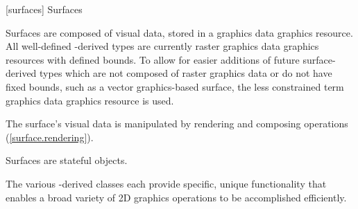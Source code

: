 
 [surfaces] {Surfaces}

\pnum
Surfaces are composed of visual data, stored in a graphics data graphics resource.
\enternote
All well-defined -derived types are currently raster graphics data graphics resources with defined bounds. To allow for easier additions of future surface-derived types which are not composed of raster graphics data or do not have fixed bounds, such as a vector graphics-based surface, the less constrained term graphics data graphics resource is used.
\exitnote

\pnum
The surface's visual data is manipulated by rendering and composing operations (\ref{surface.rendering}).

\pnum
Surfaces are stateful objects.

\pnum
The various -derived classes each provide specific, unique functionality that enables a broad variety of 2D graphics operations to be accomplished efficiently.

\addtocounter{SectionDepthBase}{1}




















\addtocounter{SectionDepthBase}{-1}
